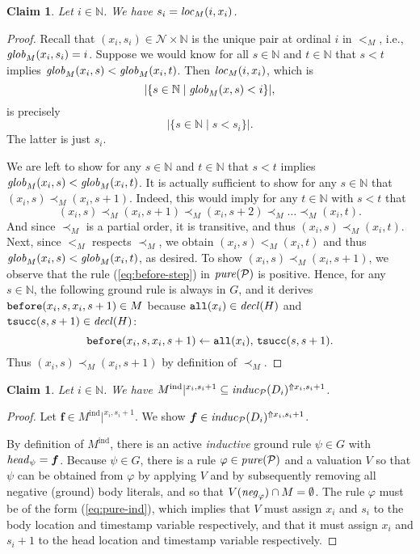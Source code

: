 \documentclass{tlp}
\newtheorem{claim}[theorem]{Claim}
\newcommand{\Nat}{\mathbb{N}}  \newcommand{\len}[1]{|#1|} \newcommand{\rom}[1]{\text{\emph{(#1)}}} \newcommand{\romI}{\rom i}
\newcommand{\ded}{\mathcal{P}}
\newcommand{\fc}{\boldsymbol{f}}
\newcommand{\rl}{\varphi}
\newcommand{\head}[1]{\fname{head}_{#1}}
\newcommand{\bneg}[1]{\fname{neg}_{#1}}
\newcommand{\grl}{\psi}
\newcommand{\nw}{\mathcal{N}}
\newcommand{\addlt}[3]{#1^{\Uparrow#2,#3}}
\newcommand{\projlt}[3]{#1|^{#2,#3}}
\newcommand{\timesucc}{\pred{tsucc}}
\newcommand{\relall}{\pred{all}}
\newcommand{\before}{\pred{before}}
\newcommand{\decl}[1]{\fname{decl}(#1)}
\newcommand{\pure}[1]{\fname{pure}(#1)}
\newcommand{\induc}[1]{\fname{induc}_{#1}}
\newcommand{\mstep}[1]{(#1)}
\newcommand{\nwnat}{\nw\times\Nat}
\newcommand{\grded}{G}
\newcommand{\cauM}{\prec_{M}}
\newcommand{\totM}{<_{M}}
\newcommand{\globM}[1]{\fname{glob}_{M}(#1)}
\newcommand{\locM}[1]{\fname{loc}_{M}(#1)}
\newcommand{\Mind}{M^{\mathrm{ind}}}
\begin{document}
\begin{appendix}
\tline



\begin{claim}\label{claim:localM}Let $i\in\Nat$. We have $s_{i}=\locM{i,x_{i}}$.\end{claim}

\begin{proof}

Recall that $(x_{i},s_{i})\in\nwnat$ is the unique pair at ordinal
$i$ in $\totM$, i.e., $\globM{x_{i},s_{i}}=i$. Suppose we would
know for all $s\in\Nat$ and $t\in\Nat$ that $s<t$ implies $\globM{x_{i},s}<\globM{x_{i},t}$.
Then $\locM{i,x_{i}}$, which is 
\[
|\{s\in\Nat\mid\globM{x,s}<i\}|,
\]
is precisely 
\[
|\{s\in\Nat\mid s<s_{i}\}|.
\]
The latter is just $s_{i}$.

We are left to show for any $s\in\Nat$ and $t\in\Nat$ that $s<t$
implies $\globM{x_{i},s}<\globM{x_{i},t}$. It is actually sufficient
to show for any $s\in\Nat$ that $(x_{i},s)\cauM(x_{i},s+1)$. Indeed,
this would imply for any $t\in\Nat$ with $s<t$ that 
\[
(x_{i},s)\cauM(x_{i},s+1)\cauM(x_{i},s+2)\cauM\ldots\cauM(x_{i},t).
\]
And since $\cauM$ is a partial order, it is transitive, and thus
$(x_{i},s)\cauM(x_{i},t)$. Next, since $\totM$ respects $\cauM$,
we obtain $(x_{i},s)\totM(x_{i},t)$ and thus $\globM{x_{i},s}<\globM{x_{i},t}$,
as desired. To show $(x_{i},s)\cauM(x_{i},s+1)$, we observe that
the rule (\ref{eq:before-step}) in $\pure{\ded}$ is positive. Hence,
for any $s\in\Nat$, the following ground rule is always in $\grded$,
and it derives $\before(x_{i},s,x_{i},s+1)\in M$ because $\relall(x_{i})\in\decl H$
and $\timesucc(s,s+1)\in\decl H$:
\[
\before(x_{i},s,x_{i},s+1)\gets\relall(x_{i}),\,\timesucc(s,s+1).
\]
Thus $(x_{i},s)\cauM(x_{i},s+1)$ by definition of $\cauM$.\end{proof}



\tline



\begin{claim}\label{claim:ind-M-in-induc}Let $i\in\Nat$. We have
$\projlt{\Mind}{x_{i}}{s_{i}+1}\subseteq\addlt{\induc{\ded}\mstep{D_{i}}}{x_{i}}{s_{i}+1}$.\end{claim}

\begin{proof}

Let $\fc\in\projlt{\Mind}{x_{i}}{s_{i}+1}$. We show $\fc\in\addlt{\induc{\ded}\mstep{D_{i}}}{x_{i}}{s_{i}+1}$. 

By definition of $\Mind$, there is an active \emph{inductive} ground
rule $\grl\in\grded$ with $\head{\grl}=\fc$. Because $\grl\in\grded$,
there is a rule $\rl\in\pure{\ded}$ and a valuation $V$ so that
$\grl$ can be obtained from $\rl$ by applying $V$ and by subsequently
removing all negative (ground) body literals, and so that $V(\bneg{\rl})\cap M=\emptyset$.
The rule $\rl$ must be of the form (\ref{eq:pure-ind}), which implies
that $V$ must assign $x_{i}$ and $s_{i}$ to the body location and
timestamp variable respectively, and that it must assign $x_{i}$
and $s_{i}+1$ to the head location and timestamp variable respectively.


\end{proof}
\end{appendix}
\end{document}
